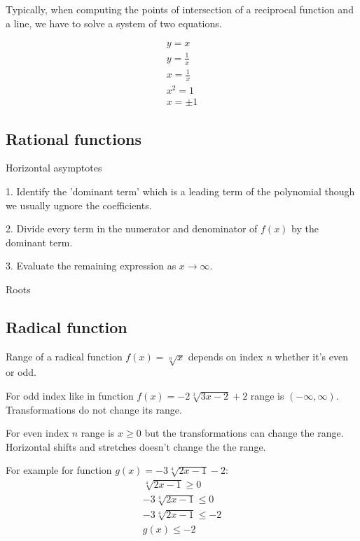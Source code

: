 \documentclass{article}
\begin{document}

Typically, when computing the points of intersection of a reciprocal
function and a line, we have to solve a system of two equations.

\begin{equation}
  \begin{gathered}
    y = x \\
    y = \frac{1}{x} \\
    x = \frac{1}{x} \\
    x^2 = 1 \\
    x = \pm 1
  \end{gathered}
\end{equation}

\subsection{Rational functions}
Horizontal asymptotes

1. Identify the 'dominant term' which is a leading term of the polynomial though we
usually ugnore the coefficients.

2. Divide every term in the numerator and denominator of $f(x)$ by the dominant term.

3. Evaluate the remaining expression as $x \to \infty$.


Roots


\subsection{Radical function}
Range of a radical function $f(x) = \sqrt[n]{x}$ depends on index \textit{n} whether it's even or odd.

For odd index like in function $f(x) = -2\sqrt[3]{3x-2}+2$ range is $(-\infty, \infty)$.
Transformations do not change its range.

For even index $n$ range is $x \geqslant 0$ but the transformations can change the range.
Horizontal shifts and stretches doesn't change the the range.

For example for function $g(x) = -3\sqrt[4]{2x-1}-2$:
\begin{equation}
  \begin{gathered}
    \sqrt[4]{2x-1} \geqslant 0 \\
    -3\sqrt[4]{2x-1} \leqslant 0 \\
    -3\sqrt[4]{2x-1} \leqslant -2 \\
    g(x) \leqslant -2
  \end{gathered}
\end{equation}
\end{document}

